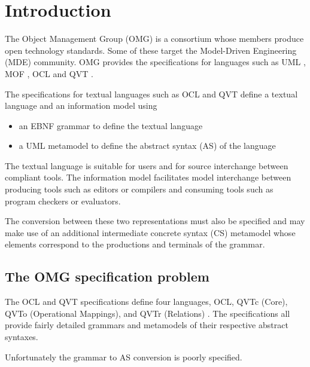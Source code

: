 \documentclass{llncs}
\begin{document}
\section{Introduction}

The Object Management Group (OMG) is a consortium whose members produce open technology standards. Some of these target the Model-Driven Engineering (MDE) community. OMG provides the specifications for languages such as UML \cite{omg2012uml}, MOF \cite{omg2013mof}, OCL \cite{omg2013ocl} and QVT \cite{omg2014qvt}.

The specifications for textual languages such as OCL and QVT define a textual language and an information model using
\begin{itemize}
\item an EBNF grammar to define the textual language
\item a UML metamodel to define the abstract syntax (AS) of the language
\end{itemize}
The textual language is suitable for users and for source interchange between compliant tools. The information model facilitates model interchange between producing tools such as editors or compilers and consuming tools such as program checkers or  evaluators.

The conversion between these two representations must also be specified and may make use of an additional intermediate concrete syntax (CS) metamodel whose elements correspond to the productions and terminals of the grammar. 


\subsection{The OMG specification problem}

The OCL \cite{omg2013ocl} and QVT \cite{omg2014qvt} specifications define four languages, OCL, QVTc (Core), QVTo (Operational Mappings), and QVTr (Relations)%
. The specifications all provide fairly detailed grammars and metamodels of their respective abstract syntaxes.

Unfortunately the grammar to AS conversion is poorly specified.
\end{document}
